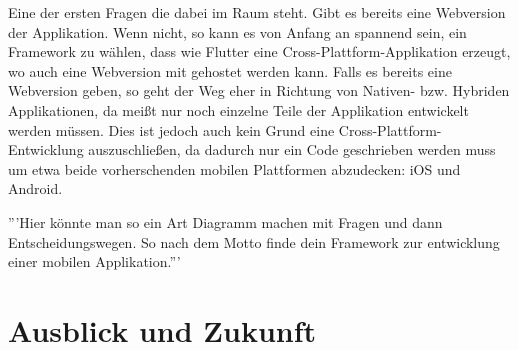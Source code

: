 Eine der ersten Fragen die dabei im Raum steht. 
Gibt es bereits eine Webversion der Applikation.
Wenn nicht, so kann es von Anfang an spannend sein, ein Framework zu wählen, dass wie Flutter eine Cross-Plattform-Applikation erzeugt, wo auch eine Webversion mit gehostet werden kann.
Falls es bereits eine Webversion geben, so geht der Weg eher in Richtung von Nativen- bzw. Hybriden Applikationen, da meißt nur noch einzelne Teile der Applikation entwickelt werden müssen. Dies ist jedoch auch kein Grund eine Cross-Plattform-Entwicklung auszuschließen, da dadurch nur ein Code geschrieben werden muss um etwa beide vorherschenden mobilen Plattformen abzudecken: iOS und Android.

'''Hier könnte man so ein Art Diagramm machen mit Fragen und dann Entscheidungswegen. So nach dem Motto finde dein Framework zur entwicklung einer mobilen Applikation.'''
\section{Ausblick und Zukunft}